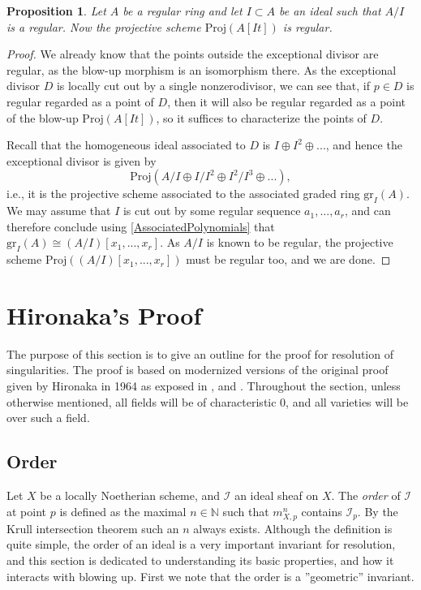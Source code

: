 \documentclass[12pt,a4paper,leqno]{article}
\newcommand{\N}{\mathbb{N}}
\newcommand{\gr}{\mathrm{gr}}
\newcommand{\proj}{\mathrm{Proj}}
\newcommand{\fref}[1]{\hyperref[{#1}]{\ref*{#1}}}
\theoremstyle{plain}
\newtheorem{prop}[theo]{Proposition}
\theoremstyle{definition}
\theoremstyle{remark}
\begin{document}
\begin{prop}
Let $A$ be a regular ring and let $I \subset A$ be an ideal such that $A/I$ is a regular. Now the projective scheme $\proj (A[It])$ is regular. 
\end{prop}
\begin{proof}
We already know that the points outside the exceptional divisor are regular, as the blow-up morphism is an isomorphism there. As the exceptional divisor $D$ is locally cut out by a single nonzerodivisor, we can see that, if $p \in D$ is regular regarded as a point of $D$, then it will also be regular regarded as a point of the blow-up $\proj (A[It])$, so it suffices to characterize the points of $D$.

Recall that the homogeneous ideal associated to $D$ is $I \oplus I^2 \oplus ...$, and hence the exceptional divisor is given by
\begin{equation*}
\proj (A/I \oplus I/I^2 \oplus I^2 / I^3 \oplus ...), 
\end{equation*}
i.e., it is the projective scheme associated to the associated graded ring $\gr_I (A)$. We may assume that $I$ is cut out by some regular sequence $a_1,...,a_r$, and can therefore conclude using \fref{AssociatedPolynomials} that $\gr_I (A) \cong (A/I)[x_1,...,x_r]$. As $A/I$ is known to be regular, the projective scheme $\proj ((A/I)[x_1,...,x_r])$ must be regular too, and we are done.
\end{proof}

\section{Hironaka's Proof}\label{HirRes}

The purpose of this section is to give an outline for the proof for resolution of singularities. The proof is based on modernized versions of the original proof given by Hironaka in 1964 as exposed in \cite{Cut}, \cite{Hau} and \cite{Kol}. Throughout the section, unless otherwise mentioned, all fields will be of characteristic 0, and all varieties will be over such a field. 

\subsection{Order}

Let $X$ be a locally Noetherian scheme, and $\mathscr{I}$ an ideal sheaf on $X$. The \emph{order} of $\mathscr{I}$ at point $p$ is defined as the maximal $n \in \N$ such that $m_{X,p}^n$ contains $\mathscr{I}_p$. By the Krull intersection theorem such an $n$ always exists. Although the definition is quite simple, the order of an ideal is a very important invariant for resolution, and this section is dedicated to understanding its basic properties, and how it interacts with blowing up. First we note that the order is a ''geometric'' invariant.
\end{document}
